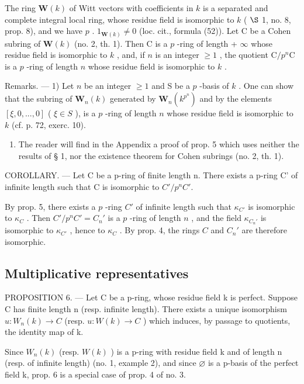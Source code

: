 The ring \(\mathbf{W}(k)\) of Witt vectors with coefficients in \(k\) is a separated and complete integral local ring, whose residue field is isomorphic to \(k\) ( \(\S\) 1, no. 8, prop. 8), and we have \(p\) . \(1_{\mathbf{W}(k)} \neq 0\) (loc. cit., formula (52)). Let C be a Cohen subring of \(\mathbf{W}(k)\) (no. 2, th. 1). Then C is a \(p\) -ring of length + \(\infty\) whose residue field is isomorphic to \(k\) , and, if \(n\) is an integer \(\geqslant 1\) , the quotient \(\mathrm{C}/p^{n}\mathrm{C}\) is a \(p\) -ring of length \(n\) whose residue field is isomorphic to \(k\) .

Remarks. --- 1) Let \(n\) be an integer \(\geqslant 1\) and S be a \(p\) -basis of \(k\) . One can show that the subring of \(\mathbf{W}_{n}(k)\) generated by \(\mathbf{W}_{n}(k^{p^{n}})\) and by the elements \([\xi, 0, ..., 0]\) ( \(\xi \in S\) ), is a \(p\) -ring of length \(n\) whose residue field is isomorphic to \(k\) (cf. p. 72, exerc. 10).

\begin{enumerate}
\def\labelenumi{\arabic{enumi})}
\setcounter{enumi}{1}
\tightlist
\item
  The reader will find in the Appendix a proof of prop. 5 which uses neither the results of § 1, nor the existence theorem for Cohen subrings (no. 2, th. 1).
\end{enumerate}

COROLLARY. --- Let C be a p-ring of finite length n. There exists a p-ring C' of infinite length such that C is isomorphic to \(C'/p^{n}C'\).

By prop. 5, there exists a \(p\) -ring \(C'\) of infinite length such that \(\kappa_{C'}\) is isomorphic to \(\kappa_{C}\) . Then \(C'/p^{n}C'=C_{n}'\) is a \(p\) -ring of length \(n\) , and the field \(\kappa_{C_{n}'}\) is isomorphic to \(\kappa_{C'}\) , hence to \(\kappa_{C}\) . By prop. 4, the rings \(C\) and \(C_{n}'\) are therefore isomorphic.

\subsection{Multiplicative representatives}

PROPOSITION 6. --- Let C be a p-ring, whose residue field k is perfect. Suppose C has finite length n (resp. infinite length). There exists a unique isomorphism \(u:W_{n}(k)\to C\) (resp. \(u:W(k)\to C\) ) which induces, by passage to quotients, the identity map of k.

Since \(W_{n}(k)\) (resp. \(W(k)\) ) is a p-ring with residue field k and of length n (resp. of infinite length) (no. 1, example 2), and since \(\varnothing\) is a p-basis of the perfect field k, prop. 6 is a special case of prop. 4 of no. 3.

